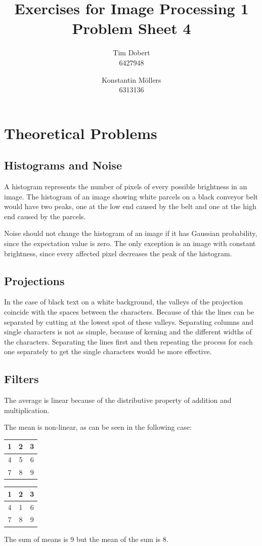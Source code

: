 \documentclass[a4paper,12pt]{article}
\title{\textbf{Exercises for Image Processing 1}\\Problem Sheet 4}
\author{Tim Dobert\\6427948 \and Konstantin M\"ollers\\6313136}
\begin{document}
	\maketitle	
	
	\section{Theoretical Problems}
	\subsection{Histograms and Noise}
		A histogram represents the number of pixels of every possible brightness in an image. The histogram of an image showing white parcels on a black conveyor belt would have two peaks, one at the low end caused by the belt and one at the high end caused by the parcels.\par
		Noise should not change the histogram of an image if it has Gaussian probability, since the expectation value is zero. The only exception is an image with constant brightness, since every affected pixel decreases the peak of the histogram.

	
	\subsection{Projections}
	In the case of black text on a white background, the valleys of the projection coincide with the spaces between the characters. Because of this the lines can be separated by cutting at the lowest spot of these valleys. Separating columns and single characters is not as simple, because of kerning and the different widths of the characters. Separating the lines first and then repeating the process for each one separately to get the single characters would be more effective.
	
	\subsection{Filters}
	The average is linear because of the distributive property of addition and multiplication.
	
	The mean is non-linear, as can be seen in the following case: 	
	\\
	\begin{center}
	\begin{tabular}{|c|c|c|}
	\hline
	1&2&3 \\
	\hline
	4&5&6 \\
	\hline
	7&8&9 \\
	\hline
	\end{tabular}
	\phantom{0000000000000}
	\begin{tabular}{|c|c|c|}
	\hline
	1&2&3 \\
	\hline
	4&1&6 \\
	\hline
	7&8&9 \\
	\hline
	\end{tabular}
	\end{center}
	The sum of means is 9 but the mean of the sum is 8.	
\end{document}
